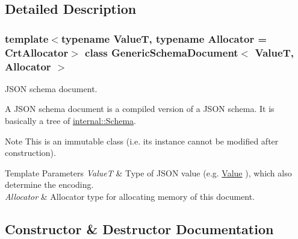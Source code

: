 \subsection{Detailed Description}
\subsubsection*{template$<$typename ValueT, typename Allocator = Crt\+Allocator$>$\newline
class Generic\+Schema\+Document$<$ Value\+T, Allocator $>$}

J\+S\+ON schema document. 

A J\+S\+ON schema document is a compiled version of a J\+S\+ON schema. It is basically a tree of \hyperlink{classinternal_1_1Schema}{internal\+::\+Schema}.

\begin{DoxyNote}{Note}
This is an immutable class (i.\+e. its instance cannot be modified after construction). 
\end{DoxyNote}

\begin{DoxyTemplParams}{Template Parameters}
{\em ValueT} & Type of J\+S\+ON value (e.\+g. {\ttfamily \hyperlink{classValue}{Value}} ), which also determine the encoding. \\
\hline
{\em Allocator} & Allocator type for allocating memory of this document. \\
\hline
\end{DoxyTemplParams}


\subsection{Constructor \& Destructor Documentation}
\mbox{\label{classGenericSchemaDocument_a5577c9b9a7a898207a50db891388231c}} 
